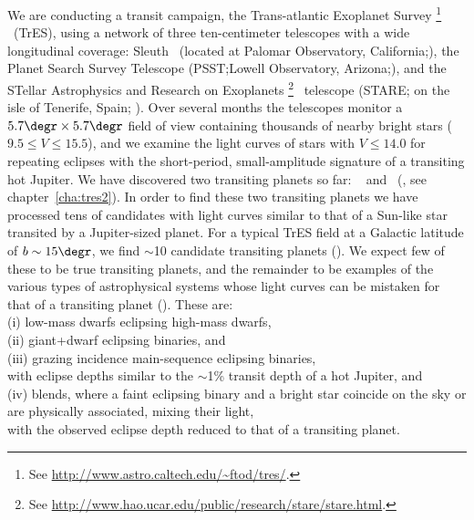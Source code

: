 We are conducting a transit campaign, the {Trans-atlantic Exoplanet Survey}%
\footnote{See \url{http://www.astro.caltech.edu/\~ftod/tres/}.}%
\ (TrES), using a network of three ten-centimeter telescopes with a wide longitudinal coverage:
{Sleuth}%
\footnotemark[\value{footnote}]%
\ (located at Palomar Observatory, California;\@ \citealt{ODonovan_Charbonneau_Kotredes:AIP:2004a}),
the Planet Search Survey Telescope (PSST;\@ Lowell Observatory, Arizona;\@ \citealt{Dunham_Mandushev_Taylor:pasp:2004a}),
and the STellar Astrophysics and Research on Exoplanets%
\footnote{See \url{http://www.hao.ucar.edu/public/research/stare/stare.html}.}%
\ telescope ({STARE}; on the isle of Tenerife, Spain; \citealt{Alonso_Deeg_Brown:an:2004a}).
Over several months the telescopes monitor a $5.7\degr \times 5.7\degr$ field of view containing thousands of nearby bright
stars ($9.5\leq V \leq 15.5$), and we examine the light curves of stars with $V\leq14.0$ for repeating eclipses with the
short-period, small-amplitude signature of a transiting hot Jupiter. We have discovered two transiting planets so far:
\tresOne\ \citep{Alonso_Brown_Torres:apjl:2004a} and \tresTwo\ (\citealp{ODonovan_Charbonneau_Mandushev:apjl:2006a},
see chapter~\ref{cha:tres2}). In order to find these two transiting planets we have processed tens of candidates with
light curves similar to that of a Sun-like star transited by a Jupiter-sized planet. For a typical TrES field at a
Galactic latitude of $b\sim15\degr$, we find $\sim$10 candidate transiting planets (\citealp[see, e.g.,][]{Dunham_Mandushev_Taylor:pasp:2004a}).%
We expect few of these to be true transiting planets, and the remainder to be examples of the various types of astrophysical
systems whose light curves can be mistaken for that of a transiting planet (\citealp[see, e.g.,][]{Brown:apjl:2003a, Charbonneau_Brown_Dunham:AIP:2004a}).%
These are: \\
\indent (i) low-mass dwarfs eclipsing high-mass dwarfs, \\
(ii) giant+dwarf eclipsing binaries, and \\
(iii) grazing incidence main-sequence eclipsing binaries, \\
with eclipse depths similar to the $\sim$1\% transit depth of a hot Jupiter, and \\
(iv) blends, where a faint eclipsing binary and a bright star coincide on the sky or are physically associated, mixing their light, \\
with the observed eclipse depth reduced to that of a transiting planet.
